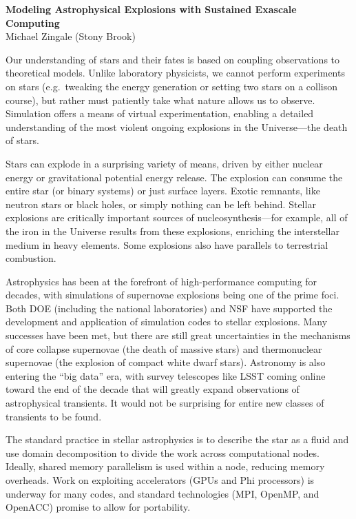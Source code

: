 \documentclass[11pt]{article}
\begin{document}
\begin{center}
{\sffamily \bfseries \large Modeling Astrophysical Explosions with Sustained Exascale Computing} \\
Michael Zingale (Stony Brook)
\end{center}

Our understanding of stars and their fates is based on coupling
observations to theoretical models.  Unlike laboratory physicists, we
cannot perform experiments on stars (e.g.\ tweaking the energy
generation or setting two stars on a collison course), but rather must
patiently take what nature allows us to observe.  Simulation offers a means
of virtual experimentation, enabling a detailed understanding of the
most violent ongoing explosions in the Universe---the death of stars.

Stars can explode in a surprising variety of means, driven by either
nuclear energy or gravitational potential energy release.  The
explosion can consume the entire star (or binary systems) or just
surface layers.  Exotic remnants, like neutron stars or black holes, or
simply nothing can be left behind.  Stellar explosions are critically
important sources of nucleosynthesis---for example, all of the iron in
the Universe results from these explosions, enriching the interstellar
medium in heavy elements.  Some explosions also have parallels to
terrestrial combustion.

Astrophysics has been at the forefront of high-performance computing
for decades, with simulations of supernovae explosions being one of
the prime foci.  Both DOE (including the national laboratories) and
NSF have supported the development and application of simulation codes
to stellar explosions.  Many successes have been met, but there are
still great uncertainties in the mechanisms of core collapse
supernovae (the death of massive stars) and thermonuclear supernovae
(the explosion of compact white dwarf stars).  Astronomy is also
entering the ``big data'' era, with survey telescopes like LSST coming
online toward the end of the decade that will greatly expand
observations of astrophysical transients.  It would not be surprising
for entire new classes of transients to be found.

The standard practice in stellar astrophysics is to describe the star
as a fluid and use domain decomposition to divide the work across
computational nodes.  Ideally, shared memory parallelism is used
within a node, reducing memory overheads.  Work on exploiting
accelerators (GPUs and Phi processors) is underway for many codes, and
standard technologies (MPI, OpenMP, and OpenACC) promise to allow for
portability.
\end{document}
